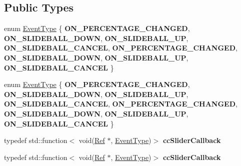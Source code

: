 \subsection*{Public Types}
\begin{DoxyCompactItemize}
\item 
enum \hyperlink{classui_1_1Slider_aaaaec31aa46f491595d338978033c267}{Event\+Type} \{ \newline
{\bfseries O\+N\+\_\+\+P\+E\+R\+C\+E\+N\+T\+A\+G\+E\+\_\+\+C\+H\+A\+N\+G\+ED}, 
{\bfseries O\+N\+\_\+\+S\+L\+I\+D\+E\+B\+A\+L\+L\+\_\+\+D\+O\+WN}, 
{\bfseries O\+N\+\_\+\+S\+L\+I\+D\+E\+B\+A\+L\+L\+\_\+\+UP}, 
{\bfseries O\+N\+\_\+\+S\+L\+I\+D\+E\+B\+A\+L\+L\+\_\+\+C\+A\+N\+C\+EL}, 
\newline
{\bfseries O\+N\+\_\+\+P\+E\+R\+C\+E\+N\+T\+A\+G\+E\+\_\+\+C\+H\+A\+N\+G\+ED}, 
{\bfseries O\+N\+\_\+\+S\+L\+I\+D\+E\+B\+A\+L\+L\+\_\+\+D\+O\+WN}, 
{\bfseries O\+N\+\_\+\+S\+L\+I\+D\+E\+B\+A\+L\+L\+\_\+\+UP}, 
{\bfseries O\+N\+\_\+\+S\+L\+I\+D\+E\+B\+A\+L\+L\+\_\+\+C\+A\+N\+C\+EL}
 \}
\item 
enum \hyperlink{classui_1_1Slider_aaaaec31aa46f491595d338978033c267}{Event\+Type} \{ \newline
{\bfseries O\+N\+\_\+\+P\+E\+R\+C\+E\+N\+T\+A\+G\+E\+\_\+\+C\+H\+A\+N\+G\+ED}, 
{\bfseries O\+N\+\_\+\+S\+L\+I\+D\+E\+B\+A\+L\+L\+\_\+\+D\+O\+WN}, 
{\bfseries O\+N\+\_\+\+S\+L\+I\+D\+E\+B\+A\+L\+L\+\_\+\+UP}, 
{\bfseries O\+N\+\_\+\+S\+L\+I\+D\+E\+B\+A\+L\+L\+\_\+\+C\+A\+N\+C\+EL}, 
\newline
{\bfseries O\+N\+\_\+\+P\+E\+R\+C\+E\+N\+T\+A\+G\+E\+\_\+\+C\+H\+A\+N\+G\+ED}, 
{\bfseries O\+N\+\_\+\+S\+L\+I\+D\+E\+B\+A\+L\+L\+\_\+\+D\+O\+WN}, 
{\bfseries O\+N\+\_\+\+S\+L\+I\+D\+E\+B\+A\+L\+L\+\_\+\+UP}, 
{\bfseries O\+N\+\_\+\+S\+L\+I\+D\+E\+B\+A\+L\+L\+\_\+\+C\+A\+N\+C\+EL}
 \}
\item 
\mbox{\label{classui_1_1Slider_ae82082b84656fffe11289961da35bdd5}} 
typedef std\+::function$<$ void(\hyperlink{classRef}{Ref} $\ast$, \hyperlink{classui_1_1Slider_aaaaec31aa46f491595d338978033c267}{Event\+Type})$>$ {\bfseries cc\+Slider\+Callback}
\item 
\mbox{\label{classui_1_1Slider_ae82082b84656fffe11289961da35bdd5}} 
typedef std\+::function$<$ void(\hyperlink{classRef}{Ref} $\ast$, \hyperlink{classui_1_1Slider_aaaaec31aa46f491595d338978033c267}{Event\+Type})$>$ {\bfseries cc\+Slider\+Callback}
\end{DoxyCompactItemize}

